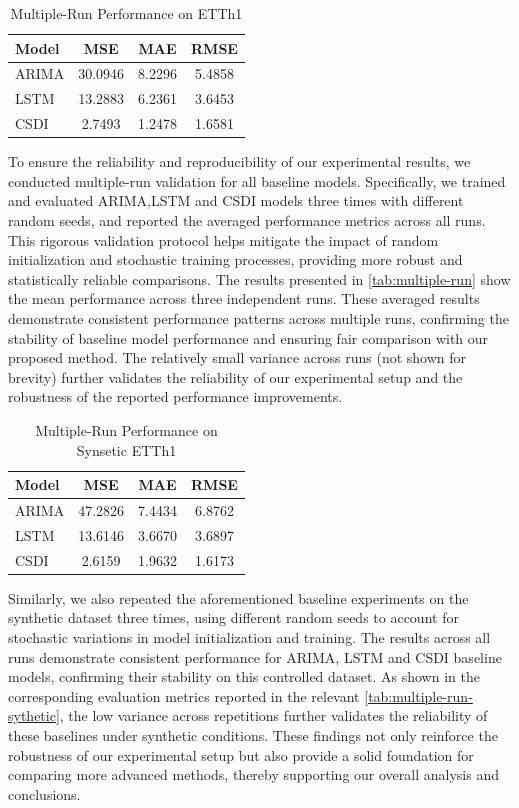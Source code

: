 \begin{table}[h]
\centering
\caption{Multiple-Run Performance on ETTh1}
\label{tab:multiple-run}
\begin{tabular}{lccc}
\hline
Model & MSE & MAE & RMSE \\
\hline
ARIMA & {30.0946} & {8.2296} & {5.4858}\\
LSTM &  {13.2883} & {6.2361} & {3.6453}\\
CSDI & {2.7493} & {1.2478} & {1.6581}\\
\hline
\end{tabular}
\end{table}
To ensure the reliability and reproducibility of our experimental results, we conducted multiple-run validation for all baseline models. Specifically, we trained and evaluated ARIMA,LSTM and CSDI models three times with different random seeds, and reported the averaged performance metrics across all runs. This rigorous validation protocol helps mitigate the impact of random initialization and stochastic training processes, providing more robust and statistically reliable comparisons. The results presented in \autoref{tab:multiple-run} show the mean performance across three independent runs. These averaged results demonstrate consistent performance patterns across multiple runs, confirming the stability of baseline model performance and ensuring fair comparison with our proposed method. The relatively small variance across runs (not shown for brevity) further validates the reliability of our experimental setup and the robustness of the reported performance improvements.

\begin{table}[h]
\centering
\caption{Multiple-Run Performance on Synsetic ETTh1}
\label{tab:multiple-run-sythetic}
\begin{tabular}{lccc}
\hline
Model & MSE & MAE & RMSE \\
\hline
ARIMA & {47.2826} & {7.4434} & {6.8762}\\
LSTM &  {13.6146} & {3.6670} & {3.6897}\\
CSDI & {2.6159} & {1.9632} & {1.6173}\\
\hline
\end{tabular}
\end{table}
Similarly, we also repeated the aforementioned baseline experiments on the synthetic dataset three times, using different random seeds to account for stochastic variations in model initialization and training. The results across all runs demonstrate consistent performance for ARIMA, LSTM and CSDI baseline models, confirming their stability on this controlled dataset. As shown in the corresponding evaluation metrics reported in the relevant \autoref{tab:multiple-run-sythetic}, the low variance across repetitions further validates the reliability of these baselines under synthetic conditions. These findings not only reinforce the robustness of our experimental setup but also provide a solid foundation for comparing more advanced methods, thereby supporting our overall analysis and conclusions.

